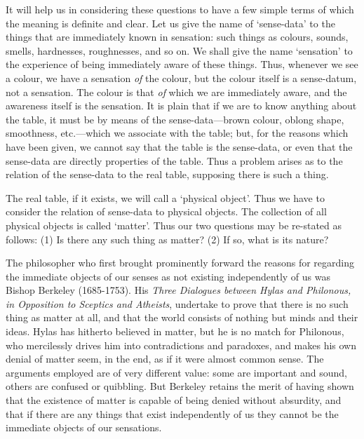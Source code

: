 \documentclass[oneside,letterpaper,12pt]{book}
\begin{document}
It will help us in considering these questions to have a few simple
terms of which the meaning is definite and clear. Let us give the name
of `sense-data' to the things that are
immediately known in sensation: such things as colours, sounds, smells,
hardnesses, roughnesses, and so on. We shall give the name
`sensation' to the experience of being
immediately aware of these things. Thus, whenever we see a colour, we
have a sensation \emph{of} the colour, but the colour itself is a
sense-datum, not a sensation. The colour is that \emph{of} which we are
immediately aware, and the awareness itself is the sensation. It is
plain that if we are to know anything about the table, it must be by
means of the sense-data---brown colour, oblong shape, smoothness,
etc.---which we associate with the table; but, for the reasons which
have been given, we cannot say that the table is the sense-data, or even
that the sense-data are directly properties of the table. Thus a problem
arises as to the relation of the sense-data to the real table, supposing
there is such a thing.

The real table, if it exists, we will call a `physical
object'. Thus we have to consider the relation of
sense-data to physical objects. The collection of all physical objects
is called `matter'. Thus our two
questions may be re-stated as follows: (1) Is there any such thing as
matter? (2) If so, what is its nature?

The philosopher who first brought prominently forward the reasons for
regarding the immediate objects of our senses as not existing
independently of us was Bishop Berkeley (1685-1753). His \emph{Three
Dialogues between Hylas and Philonous, in Opposition to Sceptics and
Atheists}, undertake to prove that there is no such thing as matter at
all, and that the world consists of nothing but minds and their ideas.
Hylas has hitherto believed in matter, but he is no match for Philonous,
who mercilessly drives him into contradictions and paradoxes, and makes
his own denial of matter seem, in the end, as if it were almost common
sense. The arguments employed are of very different value: some are
important and sound, others are confused or quibbling. But Berkeley
retains the merit of having shown that the existence of matter is
capable of being denied without absurdity, and that if there are any
things that exist independently of us they cannot be the immediate
objects of our sensations.
\end{document}
